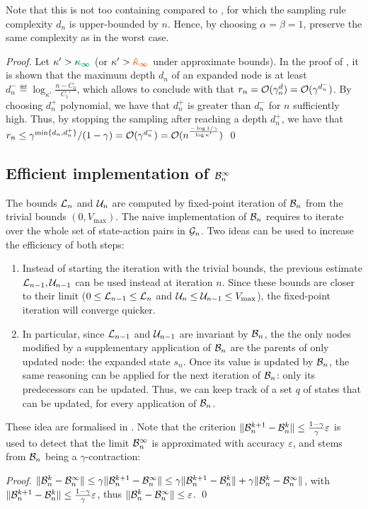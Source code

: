 \documentclass[runningheads]{llncs}
\begin{document}
Note that this is not too containing compared to \OPD, for which the sampling rule complexity $d_n$ is upper-bounded by $n$. Hence, by choosing $\alpha=\beta=1$, \GBOPD preserve the same complexity as \OPD in the worst case.

\begin{proof}
	Let $\kappa'>\hlgb{{\kappa}_\infty}$ (or $\kappa'>\hlob{\hat{\kappa}_\infty}$ under approximate bounds). In the proof of , it is shown that the maximum depth $d_n$ of an expanded node is at least $d^-_n \eqdef \log_{\kappa'}\frac{n-C_0}{C_1'}$, which allows to conclude with  that $r_n = \mathcal{O}(\gamma^d_n) = \mathcal{O}(\gamma^{d^-_n})$. By choosing $d^+_n$ polynomial, we have that $d^+_n$ is greater than $d^-_n$ for $n$ sufficiently high. Thus, by stopping the sampling after reaching a depth $d^+_n$, we have that $r_n \leq \gamma^{\min\{d_n, d^+_n\}} / (1-\gamma) = \mathcal{O}(\gamma^{d^-_n}) = \mathcal{O}(n^{\frac{-\log 1/\gamma}{\log \kappa'}})$
\qed\end{proof}

\subsection{Efficient implementation of $\mathcal{B}_n^\infty$}

The bounds $\mathcal{L}_n$ and $\mathcal{U}_n$ are computed by fixed-point iteration of $\mathcal{B}_n$ from the trivial bounds $(0,V_{\max})$. The naive implementation of $\mathcal{B}_n$ requires to iterate over the whole set of state-action pairs in $\mathcal{G}_n$. 
Two ideas can be used to increase the efficiency of both steps:
\begin{enumerate}[label=(\roman*)]
	\item Instead of starting the iteration with the trivial bounds, the previous estimate $\mathcal{L}_{n-1}, \mathcal{U}_{n-1}$ can be used instead at iteration $n$. Since these bounds are closer to their limit ($0\leq \mathcal{L}_{n-1}\leq \mathcal{L}_n$ and $\mathcal{U}_n\leq \mathcal{U}_{n-1} \leq V_{\max}$), the fixed-point iteration will converge quicker.
	\item In particular, since $\mathcal{L}_{n-1}$ and $\mathcal{U}_{n-1}$ are invariant by $\mathcal{B}_n$, the the only nodes modified by a supplementary application of $\mathcal{B}_n$ are the parents of only updated node: the expanded state $s_n$. Once its value is updated by $\mathcal{B}_n$, the same reasoning can be applied for the next iteration of $\mathcal{B}_n$: only its predecessors can be updated. Thus, we can keep track of a set $q$ of states that can be updated, for every application of $\mathcal{B}_n$.
\end{enumerate}
These idea are formalised in . Note that the criterion $\|\mathcal{B}_n^{k+1} - \mathcal{B}_n^k\| \leq \frac{1-\gamma}{\gamma}\varepsilon$ is used to detect that the limit $\mathcal{B}_n^\infty$ is approximated with accuracy $\varepsilon$, and stems from $\mathcal{B}_n$ being a $\gamma$-contraction:
\begin{proof}
$\|\mathcal{B}_n^k - \mathcal{B}_n^\infty\| \leq \gamma\| \mathcal{B}_n^{k+1} - \mathcal{B}_n^\infty\| \leq \gamma \|\mathcal{B}_n^{k+1} - \mathcal{B}_n^{k}\| + \gamma \|\mathcal{B}_n^{k} - \mathcal{B}_n^\infty\|$, with $\| \mathcal{B}_n^{k+1} - \mathcal{B}_n^{k}\| \leq \frac{1-\gamma}{\gamma}\varepsilon$, thus $\|\mathcal{B}_n^{k} - \mathcal{B}_n^\infty\| \leq \varepsilon$.
\qed\end{proof}
\end{document}
